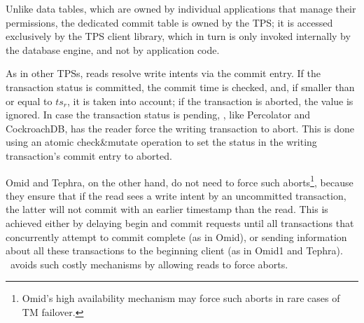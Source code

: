 Unlike data tables, which are owned by individual applications that manage their permissions,  
the dedicated commit table is owned by the TPS; it is accessed exclusively by the 
TPS client library, which in turn is only invoked   internally by the database engine, and not by application code. 

{}

As in other TPSs, reads resolve write intents via the commit entry.
If the transaction status is committed, the commit time is checked, and, if smaller than or equal to $ts_r$, it is taken into account;
if the transaction is aborted, the value is ignored.
In case the transaction status is pending, \sys, like Percolator and CockroachDB, has the reader
force the writing transaction to abort. This is done using an atomic check\&mutate operation to set the status in the
writing transaction's commit entry to aborted.

Omid and Tephra, on the other hand, do not need to force such aborts\footnote{Omid's high availability mechanism  
may force such aborts in rare cases of TM failover.}, because they ensure that  if the read sees a write intent
by an uncommitted transaction, the latter will not commit with an earlier timestamp than the read.
This is achieved  
either by delaying begin and commit requests until all transactions that concurrently attempt to commit complete (as in Omid),
or sending information about all these transactions to the beginning client (as in Omid1 and Tephra).
\sysll\ avoids such costly mechanisms by allowing reads to force aborts. 



